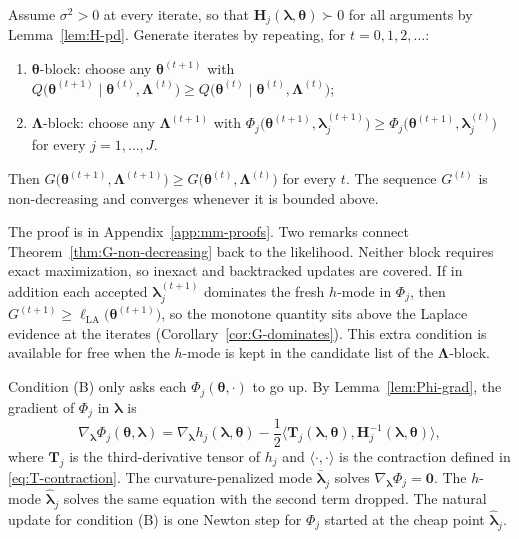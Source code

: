 \begin{theorem}
Assume $\sigma^{2}>0$ at every iterate, so that $\mathbf{H}_{j}(\bm{\lambda},\bm{\theta})\succ0$ for all arguments by Lemma~\ref{lem:H-pd}. Generate iterates by repeating, for $t=0,1,2,\ldots$:
\begin{enumerate}
    \item[(A)] $\bm{\theta}$-block: choose any $\bm{\theta}^{(t+1)}$ with $Q\big(\bm{\theta}^{(t+1)}\mid\bm{\theta}^{(t)},\bm{\Lambda}^{(t)}\big)\geq Q\big(\bm{\theta}^{(t)}\mid\bm{\theta}^{(t)},\bm{\Lambda}^{(t)}\big)$;
    \item[(B)] $\bm{\Lambda}$-block: choose any $\bm{\Lambda}^{(t+1)}$ with $\Phi_{j}\big(\bm{\theta}^{(t+1)},\bm{\lambda}_{j}^{(t+1)}\big)\geq\Phi_{j}\big(\bm{\theta}^{(t+1)},\bm{\lambda}_{j}^{(t)}\big)$ for every $j=1,\dots,J$.
\end{enumerate}
Then $G\big(\bm{\theta}^{(t+1)},\bm{\Lambda}^{(t+1)}\big)\geq G\big(\bm{\theta}^{(t)},\bm{\Lambda}^{(t)}\big)$ for every $t$. The sequence $G^{(t)}$ is non-decreasing and converges whenever it is bounded above.
\label{thm:G-non-decreasing}
\end{theorem}
 
The proof is in Appendix~\ref{app:mm-proofs}. Two remarks connect Theorem~\ref{thm:G-non-decreasing} back to the likelihood. Neither block requires exact maximization, so inexact and backtracked updates are covered. If in addition each accepted $\bm{\lambda}_{j}^{(t+1)}$ dominates the fresh $h$-mode in $\Phi_{j}$, then $G^{(t+1)}\geq\ell_{\text{LA}}\big(\bm{\theta}^{(t+1)}\big)$, so the monotone quantity sits above the Laplace evidence at the iterates (Corollary~\ref{cor:G-dominates}). This extra condition is available for free when the $h$-mode is kept in the candidate list of the $\bm{\Lambda}$-block.
 
Condition (B) only asks each $\Phi_{j}(\bm{\theta},\cdot)$ to go up. By Lemma~\ref{lem:Phi-grad}, the gradient of $\Phi_{j}$ in $\bm{\lambda}$ is
\begin{equation}
    \nabla_{\bm{\lambda}}\Phi_{j}(\bm{\theta},\bm{\lambda})=\nabla_{\bm{\lambda}}h_{j}(\bm{\lambda},\bm{\theta})-\frac{1}{2}\big\langle\mathbf{T}_{j}(\bm{\lambda},\bm{\theta}),\mathbf{H}_{j}^{-1}(\bm{\lambda},\bm{\theta})\big\rangle,
    \label{eq:Phi-grad}
\end{equation}
where $\mathbf{T}_{j}$ is the third-derivative tensor of $h_{j}$ and $\langle\cdot,\cdot\rangle$ is the contraction defined in \eqref{eq:T-contraction}. The curvature-penalized mode $\bar{\bm{\lambda}}_{j}$ solves $\nabla_{\bm{\lambda}}\Phi_{j}=\bm{0}$. The $h$-mode $\hat{\bm{\lambda}}_{j}$ solves the same equation with the second term dropped. The natural update for condition (B) is one Newton step for $\Phi_{j}$ started at the cheap point $\hat{\bm{\lambda}}_{j}$.
 
